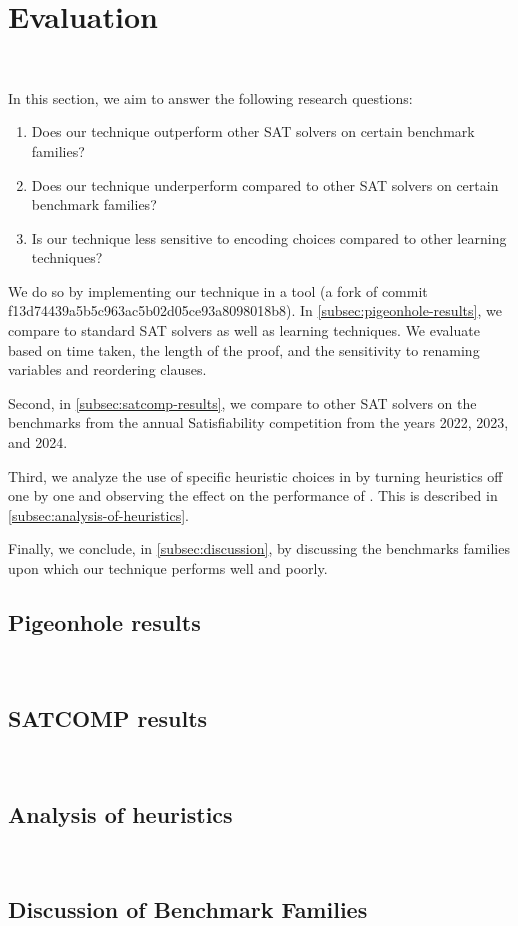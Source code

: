 \section{Evaluation}~\label{sec:evaluation}

In this section, we aim to answer the following research questions:


\begin{enumerate}
    \item Does our technique outperform other SAT solvers on certain benchmark families?
    \item Does our technique underperform compared to other SAT solvers on certain benchmark families?
    \item Is our technique less sensitive to encoding choices compared to other \pr learning techniques?
\end{enumerate}

We do so by implementing our technique in a tool \tool (a fork of \cadical commit f13d74439a5b5c963ac5b02d05ce93a8098018b8). In \autoref{subsec:pigeonhole-results}, we compare \tool to standard SAT solvers as well as \pr learning techniques. We evaluate based on time taken, the length of the proof, and the sensitivity to renaming variables and reordering clauses.

Second, in \autoref{subsec:satcomp-results}, we compare \tool to other SAT solvers on the benchmarks from the annual Satisfiability competition from the years 2022, 2023, and 2024. 

Third, we analyze the use of specific heuristic choices in \tool by turning heuristics off one by one and observing the effect on the performance of \tool. This is described in \autoref{subsec:analysis-of-heuristics}.

Finally, we conclude, in \autoref{subsec:discussion}, by discussing the benchmarks families upon which our technique performs well and poorly.


\subsection{Pigeonhole results}~\label{subsec:pigeonhole-results}

\subsection{SATCOMP results}~\label{subsec:satcomp-results}

\subsection{Analysis of heuristics}~\label{subsec:analysis-of-heuristics}

\subsection{Discussion of Benchmark Families}~\label{subsec:discussion}
